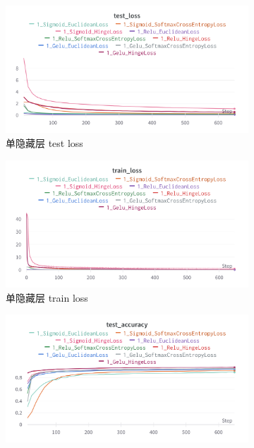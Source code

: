 \documentclass{article}
\begin{document}
\begin{figure}[htbp]
	\centering
	\begin{subfigure}{0.475\textwidth}
		\centering
		\includegraphics[width=1\textwidth]{../pics/单层实验-test_loss.png}
		\caption{单隐藏层 test loss}
	\end{subfigure}
	\begin{subfigure}{0.475\textwidth}
		\centering
		\includegraphics[width=1\textwidth]{../pics/单层实验-train_loss.png}
		\caption{单隐藏层 train loss}
	\end{subfigure}
	\begin{subfigure}{0.475\textwidth}
		\centering
		\includegraphics[width=1\textwidth]{../pics/单层实验-test_acc.png}

\end{subfigure}
\end{figure}
\end{document}
